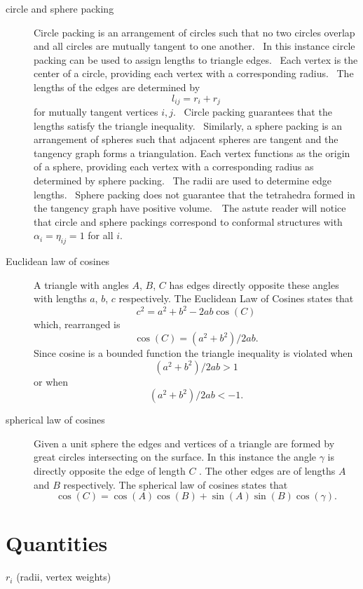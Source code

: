 \begin{description}
\item[circle and sphere packing] Circle packing is an arrangement of circles
such that no two circles overlap and all circles are mutually tangent to one
another. \ In this instance circle packing can be used to assign lengths to
triangle edges. \ Each vertex is the center of a circle, providing each
vertex with a corresponding radius. \ The lengths of the edges are
determined by 
\[
l_{ij}=r_{i}+r_{j} 
\]%
for mutually tangent vertices $i,j$. \ Circle packing guarantees that the
lengths satisfy the triangle inequality. \ Similarly, a sphere packing is an
arrangement of spheres such that adjacent spheres are tangent and the
tangency graph forms a triangulation. Each vertex functions as the origin of
a sphere, providing each vertex with a corresponding radius as determined by
sphere packing. \ The radii are used to determine edge lengths. \ Sphere
packing does not guarantee that the tetrahedra formed in the tangency graph
have positive volume.\ \ The astute reader will notice that circle and
sphere packings correspond to conformal structures with $\alpha _{i}=\eta
_{ij}=1$ for all $i$.

\item[Euclidean law of cosines] A triangle with angles $A$, $B$, $C$ has
edges directly opposite these angles with lengths $a$, $b$, $c$
respectively. The Euclidean Law of Cosines states that 
\[
c^{2}=a^{2}+b^{2}-2ab\cos (C) 
\]%
which, rearranged is 
\[
\cos (C)=(a^{2}+b^{2})/2ab. 
\]%
Since cosine is a bounded function the triangle inequality is violated when 
\[
(a^{2}+b^{2})/2ab>1 
\]%
or when 
\[
(a^{2}+b^{2})/2ab<-1. 
\]

\item[spherical law of cosines] Given a unit sphere the edges and vertices
of a triangle are formed by great circles intersecting on the surface. In
this instance the angle $\gamma $ is directly opposite the edge of length $C$%
. The other edges are of lengths $A$ and $B$ respectively. The spherical law
of cosines states that 
\[
\cos (C)=\cos (A)\cos (B)+\sin (A)\sin (B)\cos (\gamma ). 
\]
\end{description}

\bigskip

\chapter{Quantities}

\bigskip

$r_{i}$ (radii, vertex weights)

